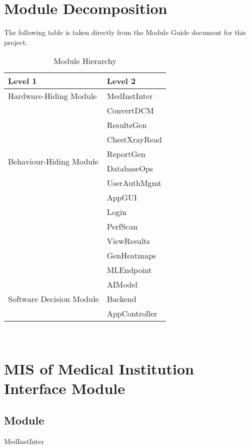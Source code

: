 \documentclass[12pt, titlepage]{article}
\begin{document}
\section{Module Decomposition}

The following table is taken directly from the Module Guide document for this project.

\begin{table}[H]
  \centering
  \begin{tabular}{p{} p{}}
    \toprule
    \textbf{Level 1} & \textbf{Level 2} \\
    \midrule

    {Hardware-Hiding Module} & MedInstInter \\
    \midrule

    \multirow{8}{0.3\textwidth}{Behaviour-Hiding Module} & ConvertDCM \\
    & ResultsGen \\
    & ChestXrayRead \\
    & ReportGen \\
    & DatabaseOps \\
    & UserAuthMgmt \\
    & AppGUI \\
    & Login \\ 
    & PerfScan \\
    & ViewResults \\
    & GenHeatmaps  \\
    & MLEndpoint  \\
    \midrule

    \multirow{5}{0.3\textwidth}{Software Decision Module} & AIModel \\
    & Backend \\
    & AppController \\
    \bottomrule

  \end{tabular}
  \caption{Module Hierarchy}
  \label{TblMH}
\end{table}
 
~\newpage

\section{MIS of Medical Institution Interface Module} \label{mMedInstInter}

\subsection{Module}
MedInstInter
\end{document}
